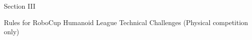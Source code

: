 \documentclass[a4paper]{article}
\begin{document}
    



\clearpage

\begin{center}
\Huge\bfseries{
\vspace*{3cm}
Section III

\vspace*{2cm}

Rules for RoboCup Humanoid League Technical Challenges (Physical competition only)}
\end{center}








\end{document}
